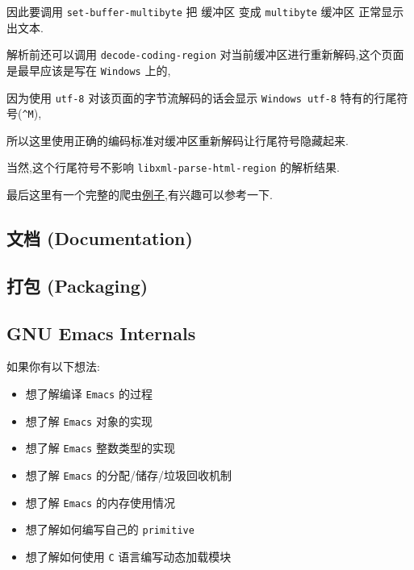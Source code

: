 \documentclass[11pt]{article}
\begin{document}
因此要调用 \texttt{set-buffer-multibyte} 把 缓冲区 变成 \texttt{multibyte} 缓冲区 正常显示出文本.

解析前还可以调用 \texttt{decode-coding-region} 对当前缓冲区进行重新解码,这个页面是最早应该是写在 \texttt{Windows} 上的,

因为使用 \texttt{utf-8} 对该页面的字节流解码的话会显示 \texttt{Windows utf-8} 特有的行尾符号(\texttt{\textasciicircum{}M}),

所以这里使用正确的编码标准对缓冲区重新解码让行尾符号隐藏起来.

当然,这个行尾符号不影响 \texttt{libxml-parse-html-region} 的解析结果.

最后这里有一个完整的爬虫\href{../../../files/web-scrapy-example.el}{例子},有兴趣可以参考一下.


\subsection{文档 (Documentation)}
\label{sec:org9c73983}

\subsection{打包 (Packaging)}
\label{sec:org3f78afb}

\subsection{GNU Emacs Internals}
\label{sec:orga0af7c5}

如果你有以下想法:

\begin{itemize}
\item 想了解编译 \texttt{Emacs} 的过程

\item 想了解 \texttt{Emacs} 对象的实现

\item 想了解 \texttt{Emacs} 整数类型的实现

\item 想了解 \texttt{Emacs} 的分配/储存/垃圾回收机制

\item 想了解 \texttt{Emacs} 的内存使用情况

\item 想了解如何编写自己的 \texttt{primitive}

\item 想了解如何使用 \texttt{C} 语言编写动态加载模块
\end{itemize}
\end{document}
